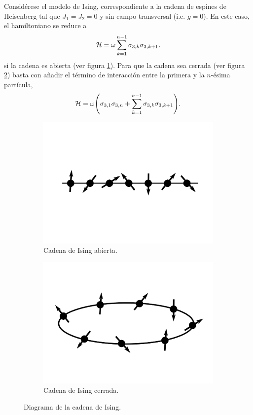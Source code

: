 Considérese el modelo de Ising, correspondiente a la cadena de espines de Heisenberg tal que $J_{1}=J_{2}=0$ y sin campo transversal (i.e. $g=0$). En este caso, el hamiltoniano se reduce a
\begin{equation}
    \mathcal{H}=\omega\sum_{k=1}^{n-1}\sigma_{3,k}\sigma_{3,k+1}.\nonumber
\end{equation}
si la cadena es abierta (ver figura \ref{fig:IsingChainOpen}). Para que la cadena sea cerrada (ver figura \ref{fig:IsingChainClosed}) basta con añadir el término de interacción entre la primera y la $n$-ésima partícula,
\begin{equation}
    \mathcal{H}=\omega\qty(\sigma_{3,1}\sigma_{3,n}+\sum_{k=1}^{n-1}\sigma_{3,k}\sigma_{3,k+1}).\nonumber
\end{equation}
\begin{figure}[ht!]
    \centering
    \begin{subfigure}{0.5\textwidth}
      \centering
      \includegraphics[width=0.7\linewidth]{chapter3/figures_special/OpenIsing.png}
      \caption{Cadena de Ising abierta. \label{fig:IsingChainOpen}}
    \end{subfigure}%
    \begin{subfigure}{0.5\textwidth}
      \centering
      \includegraphics[width=0.7\linewidth]{chapter3/figures_special/ClosedIsing.png}
      \caption{Cadena de Ising cerrada. \label{fig:IsingChainClosed}}
    \end{subfigure}
    \caption{Diagrama de la cadena de Ising. \label{fig:IsingChainOpenAndClosed}}
    
\end{figure}
